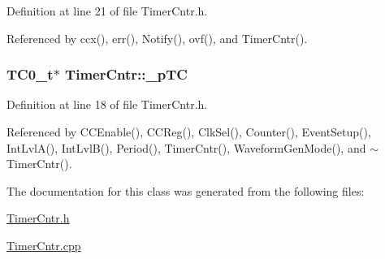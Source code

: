 Definition at line 21 of file TimerCntr.h.



Referenced by ccx(), err(), Notify(), ovf(), and TimerCntr().

\hypertarget{class_timer_cntr_ae29c58d2e9059e5b3cff07a26dcc5b91}{
\subsubsection[{\_\-pTC}]{\setlength{\rightskip}{0pt plus 5cm}TC0\_\-t$\ast$ {\bf TimerCntr::\_\-pTC}}}
\label{class_timer_cntr_ae29c58d2e9059e5b3cff07a26dcc5b91}


Definition at line 18 of file TimerCntr.h.



Referenced by CCEnable(), CCReg(), ClkSel(), Counter(), EventSetup(), IntLvlA(), IntLvlB(), Period(), TimerCntr(), WaveformGenMode(), and $\sim$TimerCntr().



The documentation for this class was generated from the following files:\begin{DoxyCompactItemize}
\item 
\hyperlink{_timer_cntr_8h}{TimerCntr.h}\item 
\hyperlink{_timer_cntr_8cpp}{TimerCntr.cpp}\end{DoxyCompactItemize}

